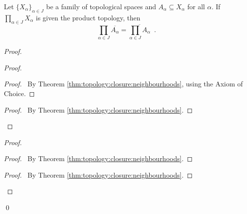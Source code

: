 \begin{thm}[AC]
  \label{thm:topology:product:closure}
  Let $\{ X_\alpha \}_{\alpha \in J}$ be a family of topological spaces and
  $A_\alpha \subseteq X_\alpha$ for all $\alpha$. If $\prod_{\alpha \in J}
  X_\alpha$ is given the product topology, then
  \[ \prod_{\alpha \in J} \overline{A_\alpha} = \overline{\prod_{\alpha \in
      J}
    A_\alpha} \enspace . \]
\end{thm}

\begin{proof}
  \pf
  \begin{proof}
    \begin{proof}
      \pf\ By Theorem \ref{thm:topology:closure:neighbourhoods}, using the
      Axiom of Choice.
    \end{proof}
    \qedstep
    \begin{proof}
      \pf\ By Theorem \ref{thm:topology:closure:neighbourhoods}.
    \end{proof}
  \end{proof}
  \begin{proof}
    \begin{proof}
      \pf\ By Theorem \ref{thm:topology:closure:neighbourhoods}.
    \end{proof}
    \qedstep
    \begin{proof}
      \pf\ By Theorem \ref{thm:topology:closure:neighbourhoods}.
    \end{proof}
  \end{proof}
  \qed
\end{proof}

